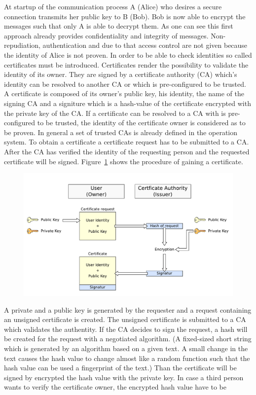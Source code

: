 At startup of the communication process A (Alice) who desires a secure connection transmits her public key to B (Bob).
Bob is now able to encrypt the messages such that only A is able to decrypt them.
As one can see this first approach already provides confidentiality and integrity of messages.
%
Non-repudiation, authentication and due to that access control are not given because the identity of Alice is not proven.
In order to be able to check identities so called certificates must be introduced.
Certificates render the possibility to validate the identity of its owner. They are signed by a certificate authority (CA) which's identity can be resolved to another CA or which is  pre-configured to be trusted.
A certificate is composed of its owner's public key, his identity, the name of the signing CA and a signiture which is a hash-value of the certificate encrypted with the private key of the CA. 
If a certificate can be resolved to a CA with is pre-configured to be trusted, the identity of the certificate owner is considered as to be proven. 
In general a set of trusted CAs is already defined in the operation system.
To obtain a certificate a certificate request has to be submitted to a CA.
After the CA has verified the identity of the requesting person and the requested certificate will be signed.
Figure~\ref{fig:certificate_request} shows the procedure of gaining a certificate.
\begin{figure}[htb]
	\centering%
 	\includegraphics[width=13cm]{tex_tls_echoservice/certificates.pdf}
	\label{fig:certificate_request}
\end{figure}
A private and a public key is generated by the requester and a request containing an unsigned certificate is created. The unsigned certificate is submitted to a CA which validates the authentity. If the CA decides to sign the request, a hash will be created for the request with a negotiated algorithm. (A fixed-sized short string which is generated by an algorithm based on a given text. A small change in the text causes the hash value to change almost like a random function such that the hash value can be used a fingerprint of the text.) Than the certificate will be signed by encrypted the hash value with the private key.
%
%
In case a third person wants to verify the certificate owner, the encrypted hash value have to be 



